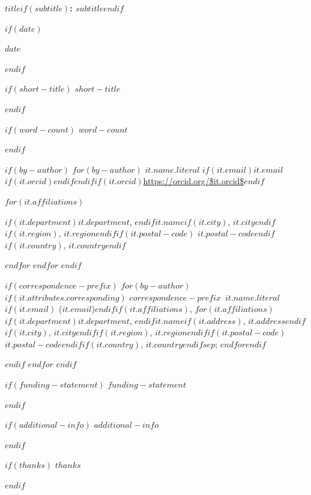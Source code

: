 %
\thispagestyle{empty}
\begingroup
\setlength{\parindent}{0.5in}

{\centering
{\bfseries\Large $title$$if(subtitle)$: $subtitle$$endif$\par}
$if(date)$
{\normalsize $date$\par}
$endif$
}

\vspace{1.5em}

$if(short-title)$
\noindent $short-title$\par
$endif$

$if(word-count)$
\noindent $word-count$\par
$endif$

$if(by-author)$
$for(by-author)$
\noindent $it.name.literal$\hfill{\small
$if(it.email)$\href{mailto:$it.email$}{$it.email$}$if(it.orcid)$\quad$endif$$endif$$if(it.orcid)$\url{https://orcid.org/$it.orcid$}$endif$}\par
$for(it.affiliations)$
{\raggedright \hspace{0.5in}$if(it.department)$$it.department$, $endif$$it.name$$if(it.city)$, $it.city$$endif$$if(it.region)$, $it.region$$endif$$if(it.postal-code)$ $it.postal-code$$endif$$if(it.country)$, $it.country$$endif$\par}
$endfor$
\baselineskip
$endfor$
$endif$

$if(correspondence-prefix)$
$for(by-author)$
$if(it.attributes.corresponding)$
\noindent $correspondence-prefix$~$it.name.literal$$if(it.email)$ (\href{mailto:$it.email$}{$it.email$})$endif$$if(it.affiliations)$, $for(it.affiliations)$$if(it.department)$$it.department$, $endif$$it.name$$if(it.address)$, $it.address$$endif$$if(it.city)$, $it.city$$endif$$if(it.region)$, $it.region$$endif$$if(it.postal-code)$ $it.postal-code$$endif$$if(it.country)$, $it.country$$endif$$sep$; $endfor$$endif$\par
$endif$
$endfor$
$endif$

$if(funding-statement)$
\noindent $funding-statement$\par
$endif$

$if(additional-info)$
\noindent $additional-info$\par
$endif$

$if(thanks)$
\noindent $thanks$\par
$endif$

\vfill
\endgroup
